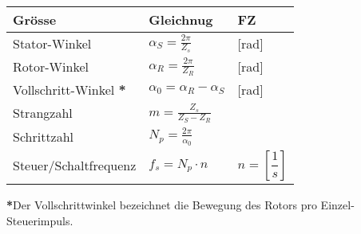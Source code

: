     \begin{minipage}{0.5\linewidth}
        \begin{tabularx}{\linewidth}{|X|l|l|}
            \hline
            \textbf{Grösse}&\textbf{Gleichnug}&\textbf{FZ} \\
            \hline
            Stator-Winkel&$ \alpha_S=\frac{2\pi}{Z_s}$&[rad] \\
            \hline    
            Rotor-Winkel&$ \alpha_R=\frac{2\pi}{Z_R}$&[rad] \\
            \hline    
            Vollschritt-Winkel \textbf{*}&$ \alpha_0 = \alpha_R - \alpha_S $ &[rad]\\
            \hline    
            Strangzahl&$ m= \frac{Z_s}{Z_S - Z_R} $& \\
            \hline 
            Schrittzahl&$ N_p = \frac{2\pi}{\alpha_0}  $& \\
            \hline        
            Steuer/Schaltfrequenz&$ f_s = N_p \cdot n $&$n=\left[\dfrac{1}{s}\right]$ \\       
            \hline              
        \end{tabularx}\vspace{0.2cm}\newline
        \textbf{*}Der Vollschrittwinkel bezeichnet die Bewegung des \newline
         Rotors pro Einzel-Steuerimpuls.       
    \end{minipage}
    \clearpage
    
